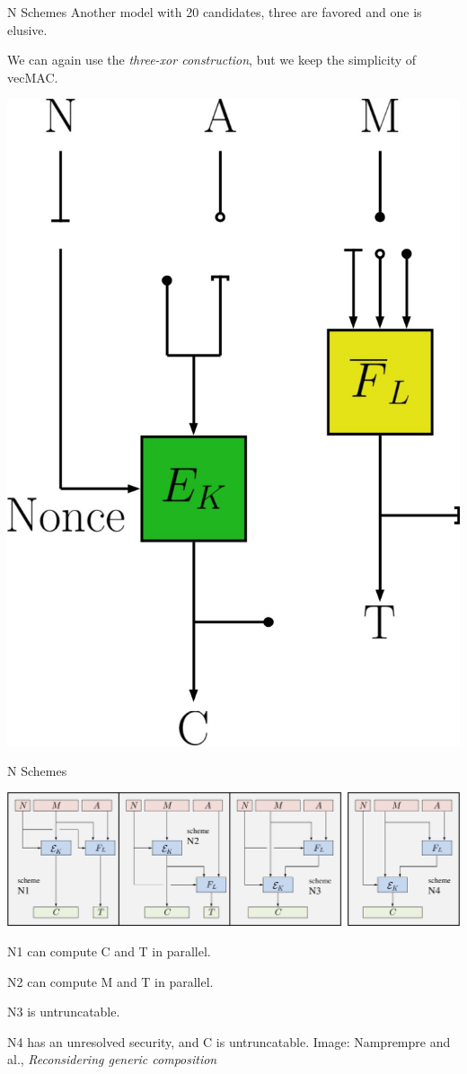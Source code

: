 \documentclass[11pt]{beamer}
\begin{document}
\begin{frame}{N Schemes}
Another model with 20 candidates, three are favored and one is elusive.

We can again use the \emph{three-xor construction}, but we keep the simplicity of vecMAC.

\begin{center}
\includegraphics[scale=0.11]{plugsNAE.jpg}
\end{center}
\end{frame}

\begin{frame}{N Schemes}
\begin{center}
\includegraphics[scale=0.22]{../report/noncemac.jpg}
\end{center}

N1 can compute C and T in parallel.

N2 can compute M and T in parallel.

N3 is untruncatable.

N4 has an unresolved security, and C is untruncatable.
\vfill
{\tiny Image: Namprempre and al., \emph{Reconsidering generic composition}}
\end{frame}
\end{document}
